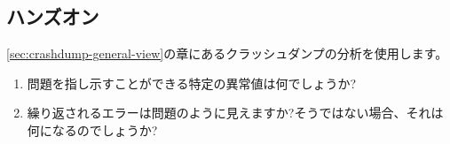 \subsection*{ハンズオン}

\ref{sec:crashdump-general-view}の章にあるクラッシュダンプの分析を使用します。

\begin{enumerate}
	\item 問題を指し示すことができる特定の異常値は何でしょうか?
	\item 繰り返されるエラーは問題のように見えますか?そうではない場合、それは何になるのでしょうか?
\end{enumerate}

